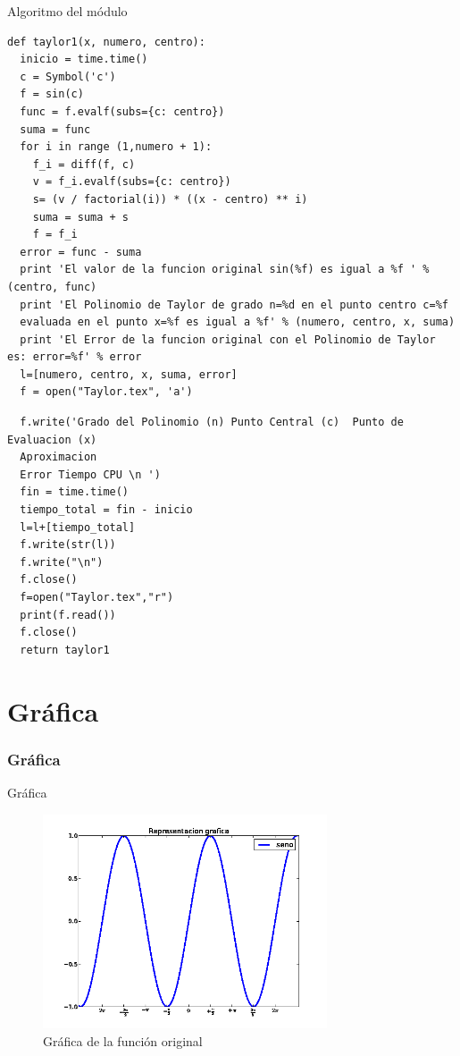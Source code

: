 \documentclass{beamer}
\begin{document}
{\begin{block}{Algoritmo del módulo}
\begin{verbatim}
def taylor1(x, numero, centro):
  inicio = time.time()
  c = Symbol('c')
  f = sin(c)
  func = f.evalf(subs={c: centro})
  suma = func
  for i in range (1,numero + 1):
    f_i = diff(f, c)
    v = f_i.evalf(subs={c: centro})
    s= (v / factorial(i)) * ((x - centro) ** i)    
    suma = suma + s
    f = f_i
  error = func - suma
  print 'El valor de la funcion original sin(%f) es igual a %f ' % (centro, func)
  print 'El Polinomio de Taylor de grado n=%d en el punto centro c=%f 
  evaluada en el punto x=%f es igual a %f' % (numero, centro, x, suma)
  print 'El Error de la funcion original con el Polinomio de Taylor es: error=%f' % error
  l=[numero, centro, x, suma, error]
  f = open("Taylor.tex", 'a')
\end{verbatim}
\end{block}
\begin{block}{ }
\begin{verbatim}
  f.write('Grado del Polinomio (n) Punto Central (c)  Punto de Evaluacion (x)  
  Aproximacion
  Error Tiempo CPU \n ')
  fin = time.time()
  tiempo_total = fin - inicio
  l=l+[tiempo_total]
  f.write(str(l))
  f.write("\n")
  f.close()
  f=open("Taylor.tex","r")
  print(f.read())
  f.close()
  return taylor1
\end{verbatim}
\end{block}
}
\section{Gráfica}
\frametitle{Gráfica}
\begin{block}{Gráfica}
\begin{center}
\begin{figure}[!th]
\includegraphics[width=0.75\textwidth]{images/grafica.png}
\caption{Gráfica de la función original}

\end{figure}
\end{center}
\end{block}
\end{document}
